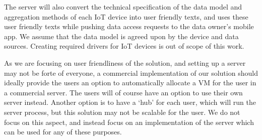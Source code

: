 \begin{enumerate}
	The server will also convert the technical specification of the data model and aggregation methods of each IoT device into user friendly texts, and uses these user friendly texts while pushing data access requests to the data owner's mobile app. We assume that the data model is agreed upon by the device and data sources. Creating required drivers for IoT devices is out of scope of this work.

	As we are focusing on user friendliness of the solution, and setting up a server may not be forte of everyone, a commercial implementation of our solution should ideally provide the users an option to automatically allocate a VM for the user in a commercial server. The users will of course have an option to use their own server instead. Another option is to have a `hub' for each user, which will run the server process, but this solution may not be scalable for the user. We do not focus on this aspect, and instead focus on an implementation of the server which can be used for any of these purposes.
\end{enumerate}